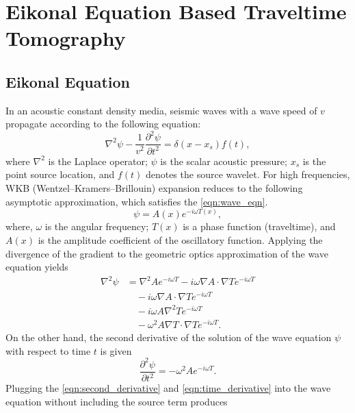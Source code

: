 \section{Eikonal Equation Based Traveltime Tomography }
\label{sec:traveltime_tomo}
\subsection{Eikonal Equation}
In an acoustic constant density media, seismic waves with a wave speed of $v$ propagate according to the following equation:
\begin{equation}
    \label{eqn:wave_eqn}
    \nabla^2\psi-\frac{1}{v^2}\frac{\partial^2\psi }{\partial t^2}  = \delta(x-x_s)f(t),
\end{equation}
where $\nabla^2$ is the Laplace operator; $\psi$ is the scalar acoustic pressure; $x_s$ is the point source location, and $f(t)$ denotes the source wavelet. For high frequencies, WKB (Wentzel–Kramers–Brillouin) expansion reduces to the following asymptotic approximation, which satisfies the \eqref{eqn:wave_eqn}.
\begin{equation}
    \label{eqn:asymptotic approximation}
    \psi=A(x)e^{-i \omega T(x)},
\end{equation}
where, $\omega$ is the angular frequency; $T(x)$ is a phase function (traveltime), and $A(x)$ is the amplitude coefficient of the oscillatory function. Applying the divergence of the gradient to the geometric optics approximation of the wave equation yields
\begin{equation}
\label{eqn:second_derivative}
\begin{split}
    \nabla^2\psi &= \nabla^2 A e^{-i \omega T}-i \omega \nabla A \cdot \nabla T e^{-i \omega T} \\&\quad - i \omega \nabla A \cdot \nabla T e^{-i \omega T} \\&\quad - i \omega A \nabla^2 T e^{-i \omega T} \\&\quad - \omega^2 A \nabla T \cdot \nabla T e^{-i \omega T}.
\end{split}
\end{equation}
On the other hand, the second derivative of the solution of the wave equation $\psi$ with respect to time $t$ is given
\begin{equation}
    \label{eqn:time_derivative}
    \frac{\partial^2\psi }{\partial t^2}=-\omega^2 A e^{-i \omega T}.
\end{equation}
Plugging the \eqref{eqn:second_derivative} and \eqref{eqn:time_derivative} into the wave equation without including the source term produces 
